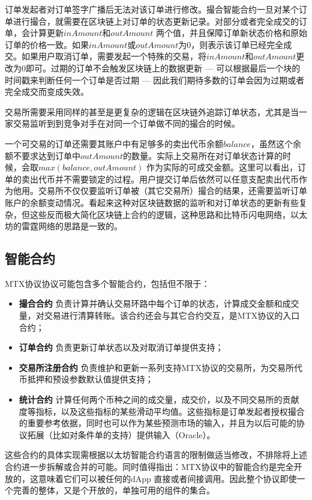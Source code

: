 \documentclass[UTF8,nofonts]{ctexart}
\begin{document}
订单发起者对订单签字广播后无法对该订单进行修改。撮合智能合约一旦对某个订单进行撮合，就需要在区块链上对订单的状态更新记录。对部分或者完全成交的订单，会计算更新$inAmount$和$outAmount$ 两个值，并且保障订单新状态价格和原始订单的价格一致。如果$inAmount$或$outAmount$为0，则表示该订单已经完全成交。如果用户取消订单，需要发起一个特殊的交易，将$inAmount$和$outAmount$更改为0即可。过期的订单不会触发区块链上的数据更新 --- 可以根据最后一个块的时间戳来判断任何一个订单是否过期 --- 因此我们期待多数的订单会因为过期或者完全成交而变成失效。

交易所需要采用同样的甚至是更复杂的逻辑在区块链外追踪订单状态，尤其是当一家交易监听到到竞争对手在对同一个订单做不同的撮合的时候。


一个可交易的订单还需要其账户中有足够多的卖出代币余额$balance$，虽然这个余额不要求达到订单中$outAmount$的数量。实际上交易所在对订单状态计算的时候，会取$max(balance, outAmount)$ 作为实际的可成交金额。这里可以看出，订单的卖出代币并不需要锁定的过程。用户提交订单后依然可以任意支配卖出代币作为他用。交易所不仅仅要监听订单被（其它交易所）撮合的结果，还需要监听订单账户的余额变动情况。看起来这种对区块链数据的监听和对订单状态的更新有些复杂，但这些反而极大简化区块链上合约的逻辑，这种思路和比特币闪电网络，以太坊的雷霆网络的思路是一致的。

\subsection{智能合约\label{sec:contracts}}

MTX协议协议可能包含多个智能合约，包括但不限于：

\begin{itemize}
	\item  \textbf{撮合合约} 负责计算并确认交易环路中每个订单的状态，计算成交金额和成交量，对交易进行清算转账。该合约还会与其它合约交互，是MTX协议的入口合约；
	\item   \textbf{订单合约} 负责更新订单状态以及对取消订单提供支持；
	\item  \textbf{交易所注册合约}  负责维护和更新一系列支持MTX协议的交易所，为交易所代币抵押和预设参数默认值提供支持；
	\item \textbf{统计合约}  计算任何两个币种之间的成交量，成交价，以及不同交易所的贡献度等指标，以及这些指标的某些滑动平均值。这些指标是订单发起者授权撮合的重要参考依据，同时也可以作为某些预测市场的输入，并且为以后可能的协议拓展（比如对条件单的支持）提供输入（Oracle）。
\end{itemize}

这些合约的具体实现需根据以太坊智能合约语言的限制做适当修改，不排除将上述合约进一步拆解或合并的可能。同时值得指出：MTX协议中的智能合约是完全开放的，这意味着它们可以被任何的dApp 直接或者间接调用。因此整个协议即使一个完善的整体，又是个开放的，单独可用的组件的集合。
\end{document}
